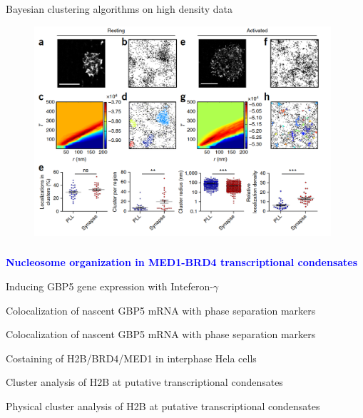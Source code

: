 \documentclass{beamer}					%
\begin{document}
\begin{frame}{Bayesian clustering algorithms on high density data}
\begin{figure}
\includegraphics[width=11cm]{Cluster.png}
\end{figure}
\end{frame}

\begin{frame}
\frametitle{}
\centering
\Large \textbf{\textcolor{blue}{Nucleosome organization in MED1-BRD4 transcriptional condensates}}
\end{frame}

\begin{frame}{Inducing GBP5 gene expression with Inteferon-$\gamma$}
\end{frame}

\begin{frame}{Colocalization of nascent GBP5 mRNA with phase separation markers}
\end{frame}

\begin{frame}{Colocalization of nascent GBP5 mRNA with phase separation markers}
\end{frame}

\begin{frame}{Costaining of H2B/BRD4/MED1 in interphase Hela cells}
\end{frame}

\begin{frame}{Cluster analysis of H2B at putative transcriptional condensates}
\end{frame}

\begin{frame}{Physical cluster analysis of H2B at putative transcriptional condensates}
\end{frame}
\end{document}
